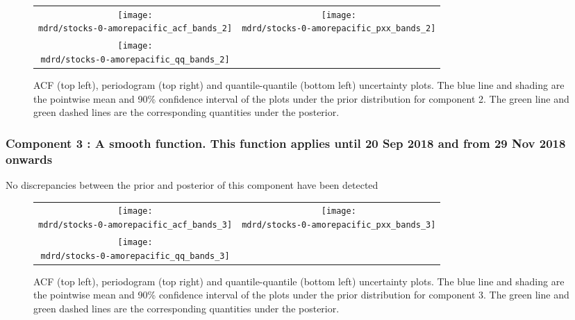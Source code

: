 \documentclass{article} %
\begin{document}
\begin{figure}[H]
\newcommand{\wmgd}{0.5\columnwidth}
\newcommand{\hmgd}{3.0cm}
\newcommand{\mdrd}{stocks-0-amorepacific}
\newcommand{\mbm}{\hspace{-0.3cm}}
\begin{tabular}{cc}
\mbm \texttt{[image: \\mdrd/stocks-0-amorepacific\_acf\_bands\_2]} & \texttt{[image: \\mdrd/stocks-0-amorepacific\_pxx\_bands\_2]} \\
\mbm \texttt{[image: \\mdrd/stocks-0-amorepacific\_qq\_bands\_2]}
\end{tabular}
\caption{
ACF (top left), periodogram (top right) and quantile-quantile (bottom left) uncertainty plots.
The blue line and shading are the pointwise mean and 90\% confidence interval of the plots under the prior distribution for component 2.
The green line and green dashed lines are the corresponding quantities under the posterior.}
\label{fig:check2}
\end{figure}

\subsubsection{Component 3 : A smooth function. This function applies until 20 Sep 2018 and from 29 Nov 2018 onwards}

No discrepancies between the prior and posterior of this component have been detected

\begin{figure}[H]
\newcommand{\wmgd}{0.5\columnwidth}
\newcommand{\hmgd}{3.0cm}
\newcommand{\mdrd}{stocks-0-amorepacific}
\newcommand{\mbm}{\hspace{-0.3cm}}
\begin{tabular}{cc}
\mbm \texttt{[image: \\mdrd/stocks-0-amorepacific\_acf\_bands\_3]} & \texttt{[image: \\mdrd/stocks-0-amorepacific\_pxx\_bands\_3]} \\
\mbm \texttt{[image: \\mdrd/stocks-0-amorepacific\_qq\_bands\_3]}
\end{tabular}
\caption{
ACF (top left), periodogram (top right) and quantile-quantile (bottom left) uncertainty plots.
The blue line and shading are the pointwise mean and 90\% confidence interval of the plots under the prior distribution for component 3.
The green line and green dashed lines are the corresponding quantities under the posterior.}
\label{fig:check3}
\end{figure}
\end{document}
